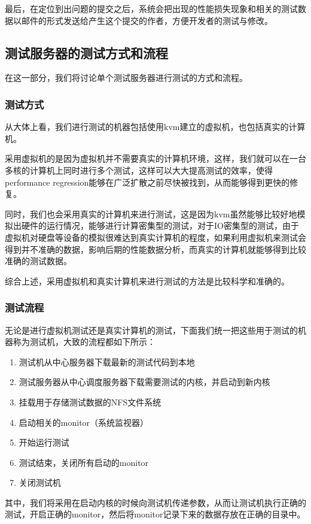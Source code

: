 \documentclass[CJK,12pt]{article}
\begin{document}
最后，在定位到出问题的提交之后，系统会把出现的性能损失现象和相关的测试数据以邮件的形式发送给产生这个提交的作者，方便开发者的测试与修改。

\subsection{测试服务器的测试方式和流程}

在这一部分，我们将讨论单个测试服务器进行测试的方式和流程。
\subsubsection{测试方式}
从大体上看，我们进行测试的机器包括使用kvm建立的虚拟机，也包括真实的计算机。

采用虚拟机的是因为虚拟机并不需要真实的计算机环境，这样，我们就可以在一台多核的计算机上同时进行多个测试，这样可以大大提高测试的效率，使得performance regression能够在广泛扩散之前尽快被找到，从而能够得到更快的修复。

同时，我们也会采用真实的计算机来进行测试，这是因为kvm虽然能够比较好地模拟出硬件的运行情况，能够进行计算密集型的测试，对于IO密集型的测试，由于虚拟机对硬盘等设备的模拟很难达到真实计算机的程度，如果利用虚拟机来测试会得到并不准确的数据，影响后期的性能数据分析，而真实的计算机就能够得到比较准确的测试数据。

综合上述，采用虚拟机和真实计算机来进行测试的方法是比较科学和准确的。
\subsubsection{测试流程}
无论是进行虚拟机测试还是真实计算机的测试，下面我们统一把这些用于测试的机器称为测试机，大致的流程都如下所示：

\begin{enumerate}
\item 测试机从中心服务器下载最新的测试代码到本地
\item 测试服务器从中心调度服务器下载需要测试的内核，并启动到新内核
\item 挂载用于存储测试数据的NFS文件系统
\item 启动相关的monitor（系统监视器）
\item 开始运行测试
\item 测试结束，关闭所有启动的monitor
\item 关闭测试机
\end{enumerate}

其中，我们将采用在启动内核的时候向测试机传递参数，从而让测试机执行正确的测试，开启正确的monitor，然后将monitor记录下来的数据存放在正确的目录中。
\end{document}
